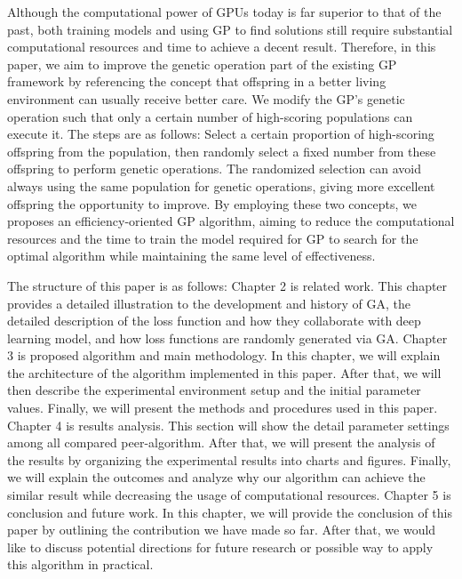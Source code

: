 \begin{ZhChapter}
Although the computational power of GPUs today is far superior to that of the past, both training models and using GP to find solutions still require substantial computational resources and time to achieve a decent result. Therefore, in this paper, we aim to improve the genetic operation part of the existing GP framework by referencing the concept that offspring in a better living environment can usually receive better care. We modify the GP's genetic operation such that only a certain number of high-scoring populations can execute it. The steps are as follows: Select a certain proportion of high-scoring offspring from the population, then randomly select a fixed number from these offspring to perform genetic operations. The randomized selection can avoid always using the same population for genetic operations, giving more excellent offspring the opportunity to improve. By employing these two concepts, we proposes an efficiency-oriented GP algorithm, aiming to reduce the computational resources and the time to train the model required for GP to search for the optimal algorithm while maintaining the same level of effectiveness.

The structure of this paper is as follows: Chapter 2 is related work. This chapter provides a detailed illustration to the development and history of GA, the detailed description of the loss function and how they collaborate with deep learning model, and how loss functions are randomly generated via GA. Chapter 3 is proposed algorithm and main methodology. In this chapter, we will explain the architecture of the algorithm implemented in this paper. After that, we will then describe the experimental environment setup and the initial parameter values. Finally, we will present the methods and procedures used in this paper. Chapter 4 is results analysis. This section will show the detail parameter settings among all compared peer-algorithm. After that, we will present the analysis of the results by organizing the experimental results into charts and figures. Finally, we will explain the outcomes and analyze why our algorithm can achieve the similar result while decreasing the usage of computational resources. Chapter 5 is conclusion and future work. In this chapter, we will provide the conclusion of this paper by outlining the contribution we have made so far. After that, we would like to discuss potential directions for future research or possible way to apply this algorithm in practical.


\end{ZhChapter}
